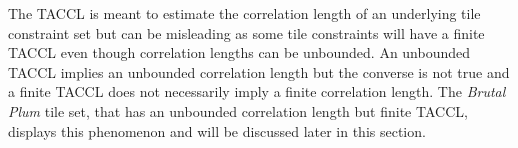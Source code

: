 The TACCL is meant to estimate the correlation length of an underlying tile constraint set but can be misleading as some
tile constraints will have a finite TACCL even though correlation lengths can be unbounded.
An unbounded TACCL implies an unbounded correlation length but the converse is not true and a finite TACCL
does not necessarily imply a finite correlation length.
The \textit{Brutal Plum} tile set, that has an unbounded correlation length but finite TACCL,
displays this phenomenon and will be discussed later in this section.

%



